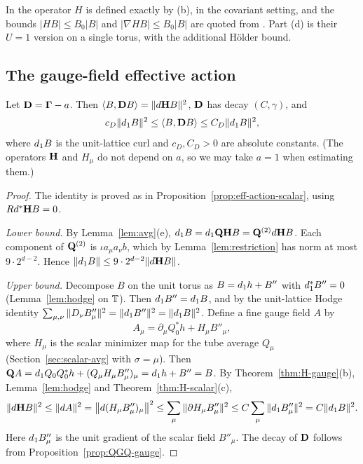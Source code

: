 \begin{remark}\label{x:11.4}
In \cite[(45)--(46)]{BalVar} the operator $H$ is defined exactly by (b), in the covariant setting, and the bounds $|HB|\le B_0|B|$ and $|\nabla HB|\le B_0|B|$ are quoted from \cite[Theorem~3.12]{BalBackground}. Part (d) is their $U=1$ version on a single torus, with the additional H\"older bound.
\end{remark}

\subsection{The gauge-field effective action}\label{ss:11.4}

\begin{proposition}\label{prop:eff-action-gauge}
Let $\mathbf D=\boldsymbol\Gamma-a$. Then $\langle B,\mathbf D B\rangle=\|d\mathbf H B\|^2$, $\mathbf D$ has decay $(C,\gamma)$, and
\[
c_D\|d_1 B\|^2\le\langle B,\mathbf D B\rangle\le C_D\|d_1 B\|^2,
\]
where $d_1 B$ is the unit-lattice curl and $c_D,C_D>0$ are absolute constants. (The operators $\mathbf H$ and $H_\mu$ do not depend on $a$, so we may take $a=1$ when estimating them.)
\end{proposition}

\begin{proof}
The identity is proved as in Proposition~\ref{prop:eff-action-scalar}, using $Rd^*\mathbf H B=0$.

\emph{Lower bound.} By Lemma~\ref{lem:avg}(e), $d_1 B=d_1\mathbf Q\mathbf H B=\mathbf Q^{(2)}d\mathbf H B$. Each component of $\mathbf Q^{(2)}$ is $\iota a_\mu a_\nu b$, which by Lemma~\ref{lem:restriction} has norm at most $9\cdot2^{d-2}$. Hence $\|d_1 B\|\le9\cdot2^{d-2}\|d\mathbf H B\|$.

\emph{Upper bound.} Decompose $B$ on the unit torus as $B=d_1 h+B''$ with $d_1^*B''=0$ (Lemma~\ref{lem:hodge} on $\mathbb T$). Then $d_1 B''=d_1 B$, and by the unit-lattice Hodge identity $\sum_{\mu,\nu}\|D_\nu B''_\mu\|^2=\|d_1 B''\|^2=\|d_1 B\|^2$. Define a fine gauge field $A$ by
\[
A_\mu=\partial_\mu Q_0^*h+H_\mu B''_\mu,
\]
where $H_\mu$ is the scalar minimizer map for the tube average $Q_\mu$ (Section~\ref{sec:scalar-avg} with $\sigma=\mu$). Then $\mathbf Q A=d_1 Q_0Q_0^*h+(Q_\mu H_\mu B''_\mu)_\mu=d_1 h+B''=B$. By Theorem~\ref{thm:H-gauge}(b), Lemma~\ref{lem:hodge} and Theorem~\ref{thm:H-scalar}(c),
\[
\|d\mathbf H B\|^2\le\|dA\|^2=\big\|d(H_\mu B''_\mu)_\mu\big\|^2\le\sum_\mu\|\partial H_\mu B''_\mu\|^2\le C\sum_\mu\|d_1 B''_\mu\|^2=C\|d_1 B\|^2 .
\]
Here $d_1 B''_\mu$ is the unit gradient of the scalar field $B''_\mu$. The decay of $\mathbf D$ follows from Proposition~\ref{prop:QGQ-gauge}.
\end{proof}

